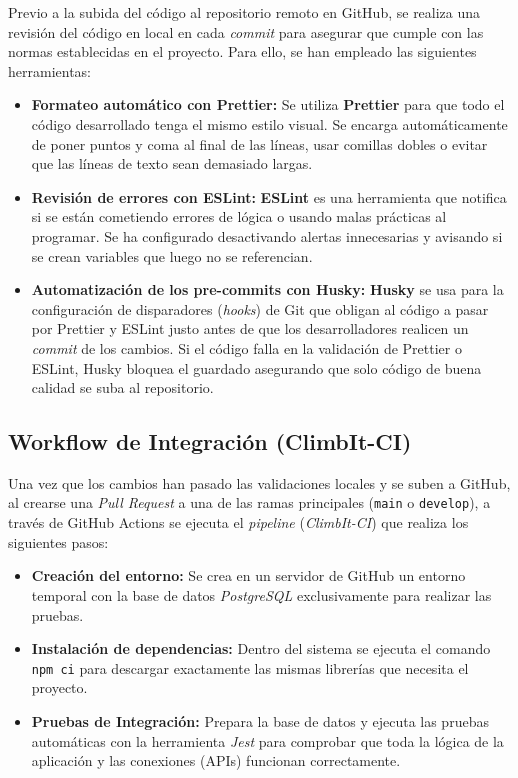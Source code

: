 Previo a la subida del código al repositorio remoto en GitHub, se realiza una revisión del código en local en cada \textit{commit} para asegurar que cumple con las normas establecidas en el proyecto. Para ello, se han empleado las siguientes herramientas:

\begin{itemize}
    \item \textbf{Formateo automático con Prettier:} Se utiliza \textbf{Prettier} para que todo el código desarrollado tenga el mismo estilo visual. Se encarga automáticamente de poner puntos y coma al final de las líneas, usar comillas dobles o evitar que las líneas de texto sean demasiado largas.
    
    \item \textbf{Revisión de errores con ESLint:} \textbf{ESLint} es una herramienta que notifica si se están cometiendo errores de lógica o usando malas prácticas al programar. Se ha configurado desactivando alertas innecesarias y avisando si se crean variables que luego no se referencian.
    
    \item \textbf{Automatización de los pre-commits con Husky:} \textbf{Husky} se usa para la configuración de disparadores (\textit{hooks}) de Git que obligan al código a pasar por Prettier y ESLint justo antes de que los desarrolladores realicen un \textit{commit} de los cambios. Si el código falla en la validación de Prettier o ESLint, Husky bloquea el guardado asegurando que solo código de buena calidad se suba al repositorio.
\end{itemize}

\subsection{Workflow de Integración (ClimbIt-CI)}

Una vez que los cambios han pasado las validaciones locales y se suben a GitHub, al crearse una \textit{Pull Request} a una de las ramas principales (\texttt{main} o \texttt{develop}), a través de GitHub Actions se ejecuta el \textit{pipeline} (\textit{ClimbIt-CI}) que realiza los siguientes pasos: 

\begin{itemize}
    \item \textbf{Creación del entorno:} Se crea en un servidor de GitHub un entorno temporal con la base de datos \textit{PostgreSQL} exclusivamente para realizar las pruebas.
    
    \item \textbf{Instalación de dependencias:} Dentro del sistema se ejecuta el comando \texttt{npm ci} para descargar exactamente las mismas librerías que necesita el proyecto.
    
    \item \textbf{Pruebas de Integración:} Prepara la base de datos y ejecuta las pruebas automáticas con la herramienta \textit{Jest} para comprobar que toda la lógica de la aplicación y las conexiones (APIs) funcionan correctamente.
\end{itemize}

